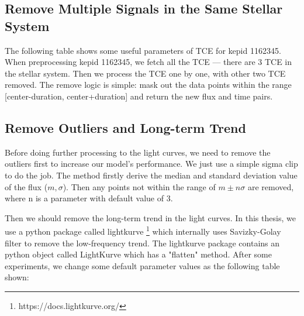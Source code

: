     \subsection{Remove Multiple Signals in the Same Stellar System}
      The following table shows some useful parameters of TCE for kepid 1162345. 
      When preprocessing kepid 1162345, we fetch all the TCE --- there are 3 TCE in the stellar 
      system. Then we process the TCE one by one, with other two TCE removed. The remove logic is simple:
      mask out the data points within the range [center-duration, center+duration] and return the new 
      flux and time pairs. 

      \begin{table}[!htp]
        \centering
        \centering
        \caption[Parameters of three TCE for kepid 1162345.]
          {Parameters of three TCE for kepid 1162345. When processing the TCE for planet 2, we remove the signals for 
          planet 1 and 3.}
        \label{table: params_1162345}
      \end{table}
    
    \subsection{Remove Outliers and Long-term Trend}
      Before doing further processing to the light curves, we need to remove the outliers 
      first to increase our model's performance. We just use a simple sigma clip to do the 
      job. The method firstly derive the median and standard deviation value
      of the flux ($m, \sigma$). Then any points not within the range of $m \pm n\sigma$ 
      are removed, where n is a parameter with default value of 3.

      Then we should remove the long-term trend in the light curves. 
      In this thesis, we use a python package called lightkurve 
      \footnote{https://docs.lightkurve.org/} which internally uses 
      Savizky-Golay filter to remove the low-frequency trend. The lightkurve package 
      contains an python object called LightKurve which has a "flatten" method. After 
      some experiments, we change some default parameter values as the following table shown:

